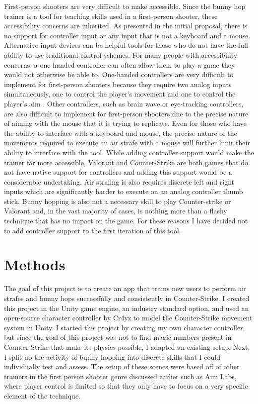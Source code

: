 \documentclass[10pt,twocolumn]{article}
\begin{document}
First-person shooters are very difficult to make accessible. Since the bunny hop trainer is a tool for teaching skills used in a first-person shooter, these accessibility concerns are inherited. As presented in the initial proposal, there is no support for controller input or any input that is not a keyboard and a mouse. Alternative input devices can be helpful tools for those who do not have the full ability to use traditional control schemes. For many people with accessibility concerns, a one-handed controller can often allow them to play a game they would not otherwise be able to. One-handed controllers are very difficult to implement for first-person shooters because they require two analog inputs simultaneously, one to control the player's movement and one to control the player's aim \cite{GameAccesibilityASurvey}. Other controllers, such as brain wave or eye-tracking controllers, are also difficult to implement for first-person shooters due to the precise nature of aiming with the mouse that it is trying to replicate. Even for those who have the ability to interface with a keyboard and mouse, the precise nature of the movements required to execute an air strafe with a mouse will further limit their ability to interface with the tool. While adding controller support would make the trainer far more accessible, Valorant and Counter-Strike are both games that do not have native support for controllers and adding this support would be a considerable undertaking. Air strafing is also requires discrete left and right inputs which are significantly harder to execute on an analog controller thumb stick. Bunny hopping is also not a necessary skill to play Counter-strike or Valorant and, in the vast majority of cases, is nothing more than a flashy technique that has no impact on the game. For these reasons I have decided not to add controller support to the first iteration of this tool.

\section{Methods}

The goal of this project is to create an app that trains new users to perform air strafes and bunny hops successfully and consistently in Counter-Strike. I created this project in the Unity game engine, an industry standard option, and used an open-source character controller by Cr4yz to model the Counter-Strike movement system in Unity\cite{fragSurf}. I started this project by creating my own character controller, but since the goal of this project was not to find magic numbers present in Counter-Strike that make its physics possible, I adapted an existing setup. Next, I split up the activity of bunny hopping into discrete skills that I could individually test and assess. The setup of these scenes were based off of other trainers in the first person shooter genre discussed earlier such as Aim Labs, where player control is limited so that they only have to focus on a very specific element of the technique.
\end{document}
